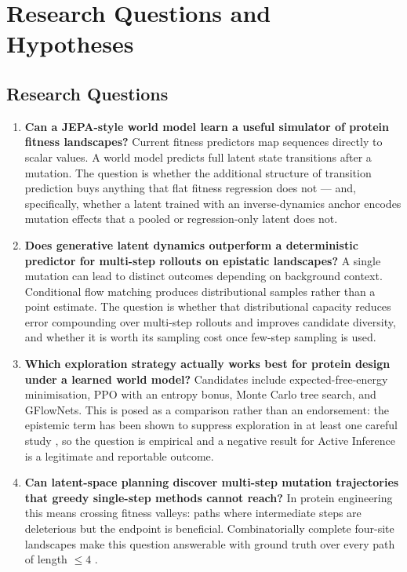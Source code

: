 \documentclass[12pt, a4paper]{article}
\begin{document}
\section{Research Questions and Hypotheses}
\label{sec:research_questions}

\subsection{Research Questions}

\begin{enumerate}
    \item \textbf{Can a JEPA-style world model learn a useful simulator of protein fitness landscapes?} Current fitness predictors map sequences directly to scalar values. A world model predicts full latent state transitions after a mutation. The question is whether the additional structure of transition prediction buys anything that flat fitness regression does not --- and, specifically, whether a latent trained with an inverse-dynamics anchor encodes mutation effects that a pooled or regression-only latent does not.

    \item \textbf{Does generative latent dynamics outperform a deterministic predictor for multi-step rollouts on epistatic landscapes?} A single mutation can lead to distinct outcomes depending on background context. Conditional flow matching produces distributional samples rather than a point estimate. The question is whether that distributional capacity reduces error compounding over multi-step rollouts and improves candidate diversity, and whether it is worth its sampling cost once few-step sampling is used.

    \item \textbf{Which exploration strategy actually works best for protein design under a learned world model?} Candidates include expected-free-energy minimisation, PPO with an entropy bonus, Monte Carlo tree search, and GFlowNets. This is posed as a comparison rather than an endorsement: the epistemic term has been shown to suppress exploration in at least one careful study \citep{champion2023deconstructing}, so the question is empirical and a negative result for Active Inference is a legitimate and reportable outcome.

    \item \textbf{Can latent-space planning discover multi-step mutation trajectories that greedy single-step methods cannot reach?} In protein engineering this means crossing fitness valleys: paths where intermediate steps are deleterious but the endpoint is beneficial. Combinatorially complete four-site landscapes make this question answerable with ground truth over every path of length $\leq 4$ \citep{wu2016indirect, johnston2024trpb}.


\end{enumerate}
\end{document}
